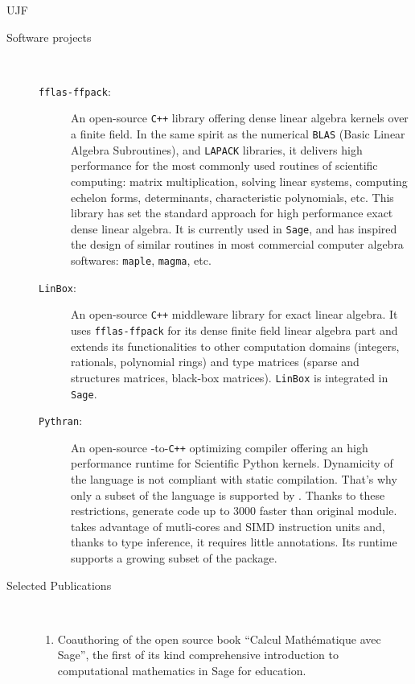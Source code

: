\begin{sitedescription}{UJF}
\begin{description}
\item[Software projects]\
  \begin{description}
 \item[\texttt{fflas-ffpack}:] An open-source \texttt{C++} library offering dense
    linear algebra kernels over a finite field. In the same  spirit as the
    numerical \texttt{BLAS} (Basic Linear Algebra Subroutines), and
    \texttt{LAPACK} libraries, it delivers high performance for the most
    commonly used routines of scientific computing: matrix multiplication,
    solving linear systems, computing echelon forms, determinants,
    characteristic polynomials, etc. This library has set the standard
    approach for high performance exact dense linear algebra. It is currently
    used in \texttt{Sage}, and has inspired the design of similar routines in
    most commercial computer algebra softwares: \texttt{maple}, \texttt{magma}, etc.
  \item[\texttt{LinBox}:] An open-source \texttt{C++} middleware library for
    exact linear algebra. It uses \texttt{fflas-ffpack} for its dense finite
    field linear algebra part and extends its functionalities to other
    computation domains (integers, rationals, polynomial rings) and type
    matrices (sparse and structures matrices, black-box
    matrices). \texttt{LinBox} is integrated in \texttt{Sage}. 
  \item[\texttt{Pythran}:] An open-source \Python-to-\texttt{C++} optimizing compiler
    offering an high performance runtime for Scientific Python kernels. Dynamicity of
    the \Python language is not compliant with static compilation. That's why only
    a subset of the \Python language is supported by \Pythran. Thanks to these
    restrictions, \Pythran generate code up to 3000 faster than original module.
    \Pythran takes advantage of mutli-cores and SIMD instruction units and,
    thanks to type inference, it requires little annotations. Its runtime
    supports a growing subset of the \Numpy package.
  \end{description}
\item[Selected Publications]\ 
\medskip\noindent
\begin{enumerate}[1.]
\item Coauthoring of the open source book ``Calcul Mathématique avec
  Sage'', the first of its kind comprehensive introduction to
  computational mathematics in Sage for education.


\end{enumerate}
\end{description}
\end{sitedescription}
